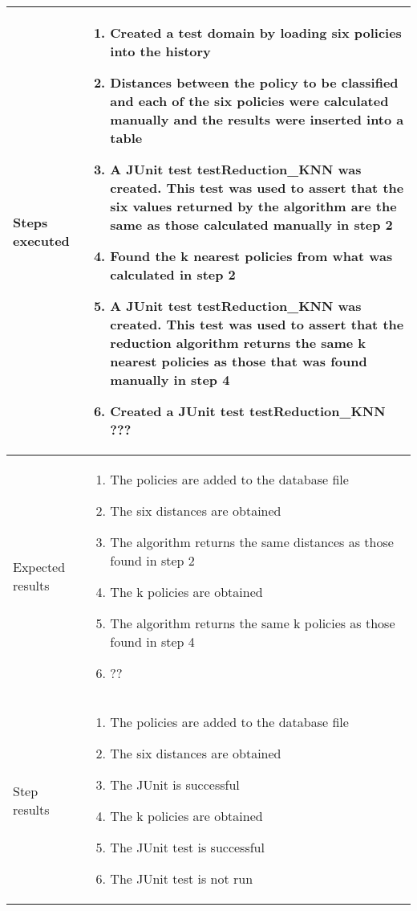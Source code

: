 \begin{center}
\begin{longtable}{ | p{4cm} | p{10cm} | }
			Steps executed & 	\begin{enumerate}
							\item Created a test domain by loading six policies into the history
							\item Distances between the policy to be classified and each of the six policies were calculated manually and the results were inserted into a table
							\item A JUnit test testReduction\_KNN was created. This test was used to assert that the six values returned by the algorithm are the same as those calculated manually in step 2
							\item Found the k nearest policies from what was calculated in step 2
							\item A JUnit test testReduction\_KNN was created. This test was used to assert that the reduction algorithm returns the same k nearest policies as those that was found manually in step 4
							\item Created a JUnit test testReduction\_KNN ???
						\end{enumerate} \\ [3pt] \hline
			
			Expected results &	\begin{enumerate}
							\item The policies are added to the database file
							\item The six distances are obtained
							\item The algorithm returns the same distances as those found in step 2
							\item The k policies are obtained
							\item The algorithm returns the same k policies as those found in step 4
							\item ??
						\end{enumerate}
							 \\  [3pt] \hline

			Step results & 	\begin{enumerate}
							\item The policies are added to the database file
							\item The six distances are obtained
							\item The JUnit is successful
							\item The k policies are obtained
							\item The JUnit test is successful
							\item The JUnit test is not run
						\end{enumerate}
							 \\  [3pt] \hline


\end{longtable}
\end{center}
